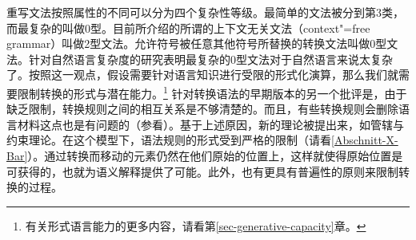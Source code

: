 重写文法按照属性的不同可以分为四个复杂性等级。最简单的文法被分到第3类，而最复杂的叫做0型。目前所介绍的所谓的上下文无关文法（context"=free grammar）叫做2型文法。允许符号被任意其他符号所替换的转换文法叫做0型文法\citep{PR73a-u}。\label{page-TG-Typ0}针对自然语言复杂度的研究表明最复杂的0型文法对于自然语言来说太复杂了。按照这一观点，假设需要针对语言知识进行受限的形式化演算\citep[]{Chomsky65a}，那么我们就需要限制转换的形式与潜在能力。\footnote{%
    有关形式语言能力的更多内容，请看第\ref{sec-generative-capacity}章。
} 
针对转换语法的早期版本的另一个批评是，由于缺乏限制，转换规则之间的相互关系是不够清楚的。而且，有些转换规则会删除语言材料这点也是有问题的（参看\citealp[\S~3.1.4]{Klenk2003a}）。基于上述原因，新的理论被提出来，如管辖与约束理论\citep{Chomsky81a}。在这个模型下，语法规则的形式受到严格的限制（请看\ref{Abschnitt-X-Bar}）。通过转换而移动的元素仍然在他们原始的位置上，这样就使得原始位置是可获得的，也就为语义解释提供了可能。此外，也有更具有普遍性的原则来限制转换的过程。


